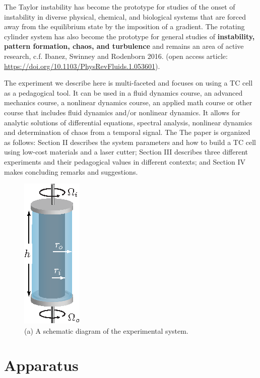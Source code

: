 \documentclass[%
 amsmath,amssymb,
 aps,
floatfix,
aps,prd,longbibliography,
notitlepage
]{revtex4-1}
\begin{document}
The Taylor instability has become the prototype for studies of the onset of instability in diverse physical, chemical, and biological systems that are forced away from the equilibrium state by the imposition of a gradient.  The rotating cylinder system has also become the prototype for general studies of {\bf instability, pattern formation, chaos, and turbulence} and remains an area of active research, c.f. Ibanez, Swinney and Rodenborn 2016. (open access article: \url{https://doi.org/10.1103/PhysRevFluids.1.053601}).  

The experiment we describe here is multi-faceted and focuses on using a TC cell as a pedagogical tool. It can be used in a fluid dynamics course, an advanced mechanics course, a nonlinear dynamics course, an applied math course or other course that includes fluid dynamics and/or nonlinear dynamics.  It allows for analytic solutions of differential equations, spectral analysis, nonlinear dynamics and determination of chaos from a temporal signal. The  The paper is organized as follows: Section II describes the system parameters and how to build a TC cell using low-cost materials and a laser cutter; Section III describes three different experiments and their pedagogical values in different contexts; and Section IV makes concluding remarks and suggestions.


\begin{figure}[ht]
  \centering
    \includegraphics[width=.15\columnwidth]{Figures/1_Apparatus.eps}
    \caption{(a) A schematic diagram of the experimental system.}\label{fig:schematic}
\end{figure}

\section{Apparatus}
\end{document}
